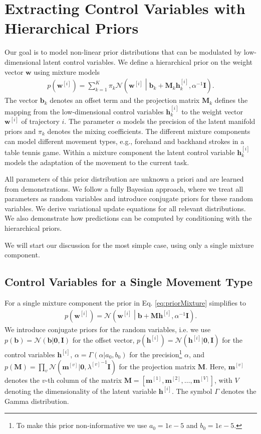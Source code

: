 \documentclass[letterpaper, 10 pt, conference]{ieeeconf}  %
\newcommand{\N}{\ensuremath{\mathcal{N}}}
\renewcommand{\vec}[1]{\ensuremath{\boldsymbol{#1}}}
\newcommand{\w}{\ensuremath{\vec w }}
\newcommand{\wi}{\ensuremath{\vec {w}^{[i]} }}
\newcommand{\wo}{\ensuremath{\vec b }}
\newcommand{\wok}{\ensuremath{\vec {b}_k }}
\newcommand{\WV}{\ensuremath{\vec M }}
\newcommand{\WVk}{\ensuremath{\vec {M}_k }}
\newcommand{\wv}{\ensuremath{ \vec {m}^{[v]} }}
\newcommand{\wvel}[1]{\ensuremath{ \vec {m}^{[#1]} }}
\newcommand{\lv}{\ensuremath{ {\lambda^{[v]}} }}
\newcommand{\hi}{\ensuremath{\vec {h}^{[i]} }}
\newcommand{\hki}{\ensuremath{\vec{h}^{[i]}_k }}
\begin{document}
\section{Extracting Control Variables with Hierarchical Priors}

Our goal is to model non-linear prior distributions that can be modulated by low-dimensional latent control variables. 
We define a hierarchical prior on the weight vector $\w$ using mixture models 
\begin{align}\label{eq:priorMixture}
  p(\wi) = \sum_{k=1}^K \pi_k \N\left(\wi\middle|\wok + \WVk \hki, \alpha^{-1}
      \vec I\right).
\end{align}
The vector $\wok$ denotes an offset term and the projection matrix
$\WVk$ defines the mapping from the low-dimensional control variables 
$\hki$ to the weight vector $\wi$ of trajectory $i$. The parameter
$\alpha$ models the precision of the latent manifold priors 
and $\pi_k$ denotes the mixing coefficients.
The different mixture components can model different movement types, e.g., forehand and backhand strokes in a table tennis game. 
Within a mixture component the latent control variable $\hki$ models the adaptation of 
the movement to the current task.

All parameters of this prior distribution are unknown a priori and are learned from demonstrations.  
We follow a fully Bayesian approach, where 
we treat all parameters as random variables and introduce conjugate priors for these random variables. We 
derive variational update equations for all relevant distributions. We also demonstrate how 
predictions can be computed by conditioning with the hierarchical priors. 

We will start our discussion for the most simple case, 
using only a single mixture component. 







\subsection{Control Variables for a Single Movement Type}\label{sec:latentSingle}

For a single mixture component the prior in Eq. \eqref{eq:priorMixture} simplifies to 
\begin{align*}
p(\wi) = \N\left(\wi\middle|\wo +\WV \hi, \alpha^{-1} \vec I\right).
\end{align*}
We introduce conjugate priors for the random variables, i.e. 
we use $p(\wo) = \N(\wo|\vec 0,\vec I)$ for the offset vector, 
 $p(\hi)= \N(\hi|\vec 0,\vec I)$ for the control variables $\hi$, 
 $\alpha=\Gamma(\alpha|a_0,b_0)$ for the precision\footnote{To make this prior non-informative we use $a_0=1e-5$ and $b_0=1e-5$.} $\alpha$, 
 and $p(\WV) = \prod_v \N(\wv | \vec 0,\lv^{-1} \vec I)$ for the projection matrix $\WV$.
Here, $\wv$ denotes the $v$-th column of the matrix $\WV=[\wvel{1}, \wvel{2}, \dots, \wvel{V}]$, 
with $V$ denoting the dimensionality of the latent variable $\hi$.
The symbol $\Gamma$ denotes the Gamma distribution. 
\end{document}
